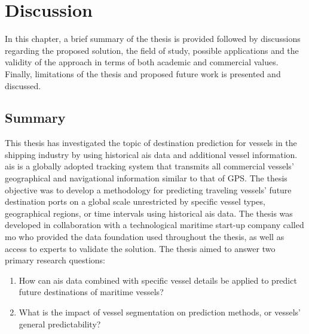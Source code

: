 \chapter{Discussion}
\label{chap:discussion}

In this chapter, a brief summary of the thesis is provided followed by discussions regarding the proposed solution, the field of study, possible applications and the validity of the approach in terms of both academic and commercial values. Finally, limitations of the thesis and proposed future work is presented and discussed.

\section{Summary}

This thesis has investigated the topic of destination prediction for vessels in the shipping industry by using historical \acrfull{ais} data and additional vessel information. \acrshort{ais} is a globally adopted tracking system that transmits all commercial vessels' geographical and navigational information similar to that of GPS\@. The thesis objective was to develop a methodology for predicting traveling vessels' future destination ports on a global scale unrestricted by specific vessel types, geographical regions, or time intervals using historical \acrshort{ais} data. The thesis was developed in collaboration with a technological maritime start-up company called \acrfull{mo} who provided the data foundation used throughout the thesis, as well as access to experts to validate the solution. The thesis aimed to answer two primary research questions:

\begin{enumerate}
    \item How can \acrshort{ais} data combined with specific vessel details be applied to predict future destinations of maritime vessels?
    \item What is the impact of vessel segmentation on prediction methods, or vessels' general predictability?
\end{enumerate}

